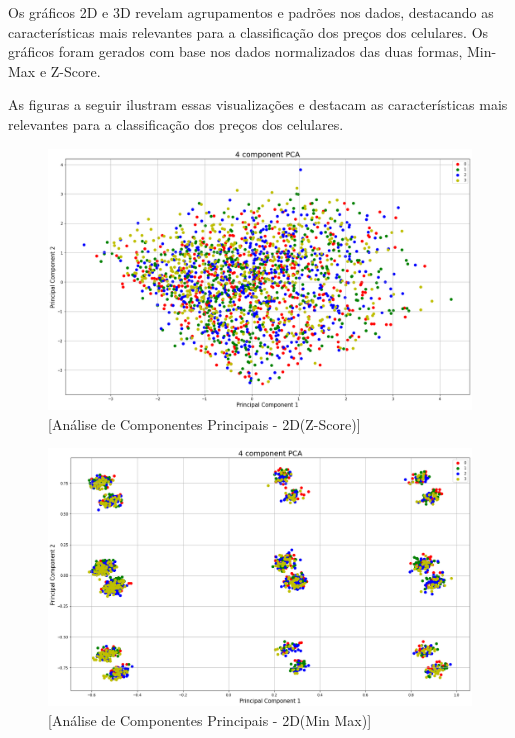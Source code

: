 \documentclass[conference]{IEEEtran}
\begin{document}
Os gráficos 2D e 3D revelam agrupamentos e padrões nos dados,
destacando as características mais relevantes para a classificação 
dos preços dos celulares. 
Os gráficos foram gerados com base nos dados normalizados
das duas formas, Min-Max e Z-Score.

As figuras a seguir ilustram essas visualizações e destacam as características
mais relevantes para a classificação dos preços dos celulares.


\begin{figure}[htbp]
    \centerline{\includegraphics[scale=0.2]{xzscore-pca-2d.png}}
    \caption{[Análise de Componentes Principais - 2D(Z-Score)]}
    \label{fig:imagem2}
\end{figure}

\begin{figure}[htbp]
    \centerline{\includegraphics[scale=0.2]{min_max-pca-2d.png}}
    \caption{[Análise de Componentes Principais - 2D(Min Max)]}
    \label{fig:imagem3}
\end{figure}
\end{document}
